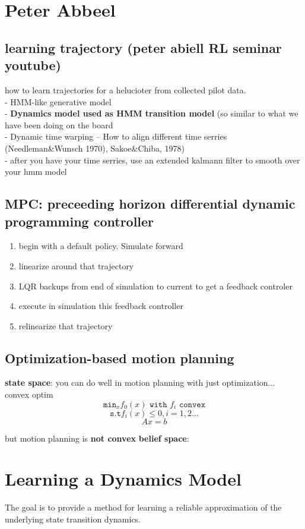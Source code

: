 \documentclass[11pt]{article}
\begin{document}
 \section {Peter Abbeel}
 \subsection{learning trajectory (peter abiell RL seminar youtube)}
 how to learn trajectories for a helucioter from collected pilot data.\\
 - HMM-like generative model\\
 - \textbf{Dynamics model used as HMM transition model} (so similar to what we have
 been doing on the board\\
 - Dynamic time warping -- How to align different time serries (Needleman\&Wunsch 1970),
 Sakoe\&Chiba, 1978)\\
 - after you have your time serries, use an extended kalmann filter
 to smooth over your hmm model

 \subsection{MPC: preceeding horizon differential dynamic programming controller}
 \begin{enumerate}
 \item begin with a default policy. Simulate forward
 \item linearize around that trajectory
 \item LQR backups from end of simulation to current to get a feedback controler
 \item execute in simulation this feedback controller
 \item relinearize that trajectory
 \end{enumerate}

 \subsection{Optimization-based motion planning}
 \textbf{state space}: you can do well in motion planning with just optimization...\\
 convex optim
 \[\texttt{min}_x f_0(x)  \texttt{         with $f_i$ convex}\]
 \[\texttt{s.t} f_i(x)\leq 0, i=1,2... \]
 \[ Ax=b\]

 but motion planning is \textbf{not convex}
 \textbf{belief space}:
 


\section{Learning a Dynamics Model}
The goal is to provide a method for learning a reliable approximation of the underlying
state transition dynamics.
\end{document}
